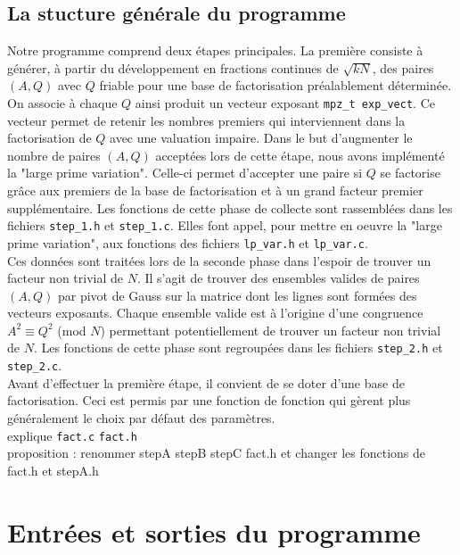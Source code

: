 \subsection{La stucture générale du programme}

Notre programme comprend deux étapes principales. La première consiste à générer, 
à partir du développement en fractions continues de $ \sqrt{kN} $, des paires 
$(A, Q)$ avec $Q$ friable pour une base de factorisation préalablement déterminée.
On associe à chaque $Q$ ainsi produit un vecteur exposant \texttt{mpz\_t exp\_vect}.
Ce vecteur permet de retenir les nombres premiers qui interviennent dans la 
factorisation de $Q$ avec une valuation impaire. Dans le but d'augmenter le nombre
de paires $(A,Q) $ acceptées lors de cette étape, nous avons implémenté la "large 
prime variation". Celle-ci permet d'accepter une paire si $Q$ se factorise  grâce
aux premiers de la base de factorisation et à un grand facteur premier 
supplémentaire. Les fonctions de cette phase de collecte sont rassemblées dans les
fichiers \texttt{step\_1.h} et \texttt{step\_1.c}. Elles font appel, pour mettre
en oeuvre la "large prime variation", aux fonctions des fichiers \texttt{lp\_var.h}
et \texttt{lp\_var.c}. \\
 
Ces données sont traitées lors de la seconde phase dans l'espoir de trouver un 
facteur non trivial de $N$. Il s'agit de trouver des ensembles valides de paires
$(A, Q)$ par pivot de Gauss sur la matrice dont les lignes sont formées des 
vecteurs exposants. Chaque ensemble valide est à l'origine d'une congruence
$A^2 \equiv Q^2$ (mod $N$) permettant potentiellement de trouver un facteur non
trivial de $N$. Les fonctions de cette phase sont regroupées dans les fichiers
\texttt{step\_2.h} et \texttt{step\_2.c}. \\

Avant d'effectuer la première étape, il convient de se doter d'une base de 
factorisation. Ceci est permis par une fonction de fonction 
qui gèrent plus généralement le choix par défaut des paramètres. \\

explique \texttt{fact.c} \texttt{fact.h} \\ 
proposition : renommer stepA stepB stepC fact.h et changer les fonctions de 
fact.h et stepA.h


\newpage

\section{Entrées et sorties du programme}

